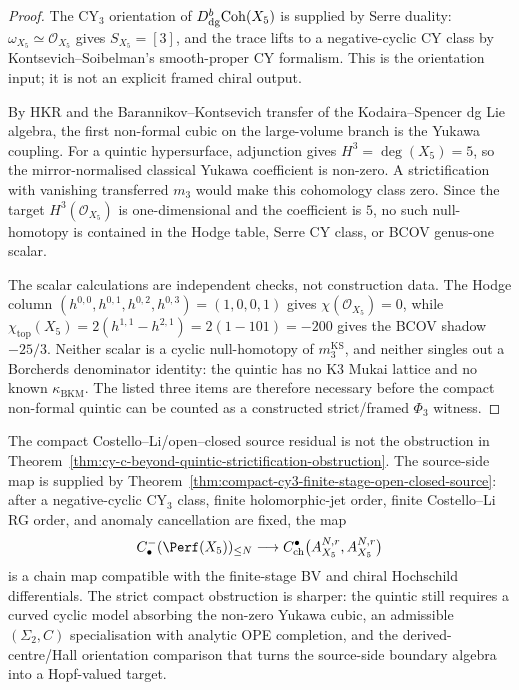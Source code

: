 \begin{proof}
The CY$_3$ orientation of $D^b_{\mathrm{dg}}\mathrm{Coh}(X_5)$ is supplied by
Serre duality: $\omega_{X_5}\simeq\mathcal O_{X_5}$ gives
$S_{X_5}=[3]$, and the trace lifts to a negative-cyclic CY class by
Kontsevich--Soibelman's smooth-proper CY formalism. This is the
orientation input; it is not an explicit framed chiral output.

By HKR and the Barannikov--Kontsevich transfer of the
Kodaira--Spencer dg Lie algebra, the first non-formal cubic on the
large-volume branch is the Yukawa coupling. For a quintic hypersurface,
adjunction gives $H^3=\deg(X_5)=5$, so the mirror-normalised classical
Yukawa coefficient is non-zero. A strictification with vanishing
transferred $m_3$ would make this cohomology class zero. Since the
target $H^3(\mathcal O_{X_5})$ is one-dimensional and the coefficient
is $5$, no such null-homotopy is contained in the Hodge table, Serre
CY class, or BCOV genus-one scalar.

The scalar calculations are independent checks, not construction data.
The Hodge column $(h^{0,0},h^{0,1},h^{0,2},h^{0,3})=(1,0,0,1)$ gives
$\chi(\mathcal O_{X_5})=0$, while
$\chi_{\mathrm{top}}(X_5)=2(h^{1,1}-h^{2,1})=2(1-101)=-200$ gives
the BCOV shadow $-25/3$. Neither scalar is a cyclic null-homotopy of
$m_3^{\mathrm{KS}}$, and neither singles out a Borcherds denominator
identity: the quintic has no K3 Mukai lattice and no known
$\kappa_{\mathrm{BKM}}$. The listed three items are therefore necessary
before the compact non-formal quintic can be counted as a constructed
strict/framed $\Phi_3$ witness.
\end{proof}

\begin{remark}
\label{rem:cy-c-beyond-compact-cl-source-bridge}
The compact Costello--Li/open--closed source residual is not the
obstruction in
Theorem~\ref{thm:cy-c-beyond-quintic-strictification-obstruction}. The
source-side map is supplied by
Theorem~\ref{thm:compact-cy3-finite-stage-open-closed-source}: after a
negative-cyclic CY$_3$ class, finite holomorphic-jet order, finite
Costello--Li RG order, and anomaly cancellation are fixed, the map
\[
 C^-_\bullet(\Perf(X_5))_{\leq N}
 \longrightarrow
 C^\bullet_{\mathrm{ch}}
 \bigl(A_{X_5}^{N,r},A_{X_5}^{N,r}\bigr)
\]
is a chain map compatible with the finite-stage BV and chiral
Hochschild differentials. The strict compact obstruction is sharper:
the quintic still requires a curved cyclic model absorbing the non-zero
Yukawa cubic, an admissible $(\Sigma_2,C)$ specialisation with analytic
OPE completion, and the derived-centre/Hall orientation comparison that
turns the source-side boundary algebra into a Hopf-valued target.
\end{remark}

